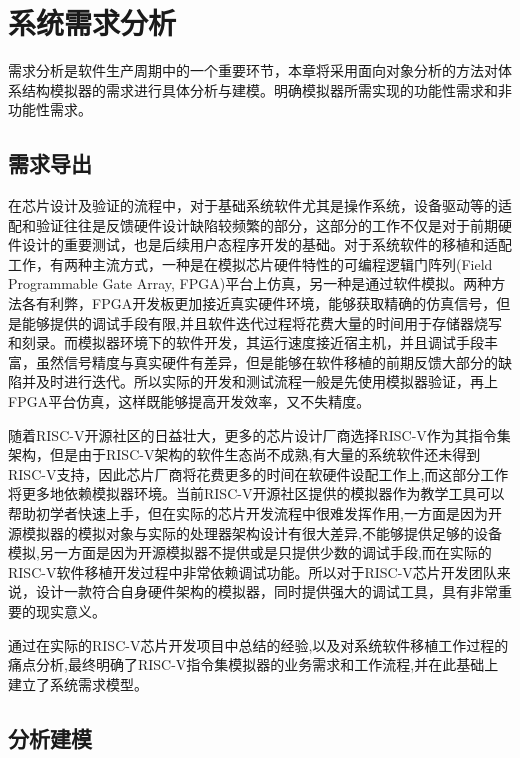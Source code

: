 
\chapter{系统需求分析}

需求分析是软件生产周期中的一个重要环节，本章将采用面向对象分析的方法对体系结构模拟器的需求进行具体分析与建模。明确模拟器所需实现的功能性需求和非功能性需求。

\section{需求导出}

在芯片设计及验证的流程中，对于基础系统软件尤其是操作系统，设备驱动等的适配和验证往往是反馈硬件设计缺陷较频繁的部分，这部分的工作不仅是对于前期硬件设计的重要测试，也是后续用户态程序开发的基础。对于系统软件的移植和适配工作，有两种主流方式，一种是在模拟芯片硬件特性的可编程逻辑门阵列(Field Programmable Gate Array, FPGA)平台上仿真，另一种是通过软件模拟。两种方法各有利弊，FPGA开发板更加接近真实硬件环境，能够获取精确的仿真信号，但是能够提供的调试手段有限,并且软件迭代过程将花费大量的时间用于存储器烧写和刻录。而模拟器环境下的软件开发，其运行速度接近宿主机，并且调试手段丰富，虽然信号精度与真实硬件有差异，但是能够在软件移植的前期反馈大部分的缺陷并及时进行迭代。所以实际的开发和测试流程一般是先使用模拟器验证，再上FPGA平台仿真，这样既能够提高开发效率，又不失精度。


随着RISC-V开源社区的日益壮大，更多的芯片设计厂商选择RISC-V作为其指令集架构，但是由于RISC-V架构的软件生态尚不成熟,有大量的系统软件还未得到RISC-V支持，因此芯片厂商将花费更多的时间在软硬件设配工作上,而这部分工作将更多地依赖模拟器环境。当前RISC-V开源社区提供的模拟器作为教学工具可以帮助初学者快速上手，但在实际的芯片开发流程中很难发挥作用,一方面是因为开源模拟器的模拟对象与实际的处理器架构设计有很大差异,不能够提供足够的设备模拟,另一方面是因为开源模拟器不提供或是只提供少数的调试手段,而在实际的RISC-V软件移植开发过程中非常依赖调试功能。所以对于RISC-V芯片开发团队来说，设计一款符合自身硬件架构的模拟器，同时提供强大的调试工具，具有非常重要的现实意义。


通过在实际的RISC-V芯片开发项目中总结的经验,以及对系统软件移植工作过程的痛点分析,最终明确了RISC-V指令集模拟器的业务需求和工作流程,并在此基础上建立了系统需求模型。


\section{分析建模}

